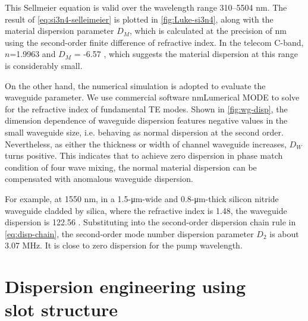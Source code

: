 This Sellmeier equation is valid over the wavelength range 310–5504 \si{\nm}.
The result of \autoref{eq:si3n4-selleimeier} is plotted in \autoref{fig:Luke-si3n4}, along with the material dispersion parameter $D_M$, which is calculated at the precision of \si{\nm} using the second-order finite difference of refractive index. In the telecom C-band, $n$=1.9963 and $D_M$ = -6.57 \dispu, which suggests the material dispersion at this range is considerably small.

\begin{figure}
    \centering
    
    \label{fig:Luke-si3n4}
\end{figure}

On the other hand, the numerical simulation is adopted to evaluate the waveguide parameter.
We use commercial software \si{\nm}{Lumerical MODE} to solve for the refractive index of fundamental TE modes.
Shown in \autoref{fig:wg-disp}, the dimension dependence of waveguide dispersion features negative values in the small waveguide size, i.e. behaving as normal dispersion at the second order. Nevertheless, as either the thickness or width of channel waveguide increases,
$D_W$ turns positive. This indicates that to achieve zero dispersion in phase match condition of four wave mixing, the normal material dispersion can be compensated with anomalous waveguide dispersion. 

For example, at 1550 \si{\nm}, in a 1.5-\si{\um}-wide and 0.8-\si{\um}-thick silicon nitride waveguide cladded by silica, where the refractive index is 1.48,
the waveguide dispersion is 122.56 \dispu. Substituting into the second-order dispersion chain rule in \autoref{eq:disp-chain}, the second-order mode number dispersion parameter $ D_2 $ is about 3.07 MHz. It is close to zero dispersion for the pump wavelength.

\begin{figure}
	\centering
	
	\label{fig:wg-disp}
\end{figure}

\section[{Dispersion engineering using slot structure}]{Dispersion engineering using \\ slot structure}

